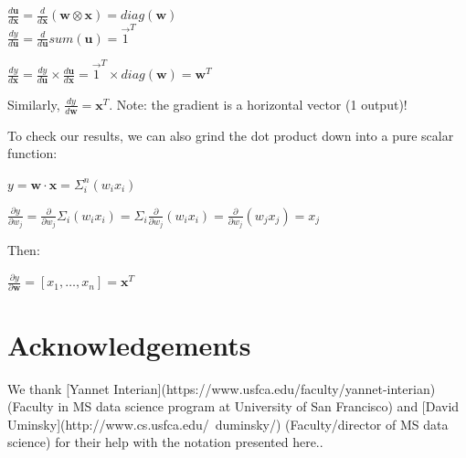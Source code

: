 \documentclass[11pt]{article}
\begin{document}
$\frac{d \mathbf{u}}{d\mathbf{x}} = \frac{d}{d\mathbf{x}} (\mathbf{w} \otimes \mathbf{x}) = diag(\mathbf{w})$\\
$\frac{dy}{d\mathbf{u}} = \frac{d}{d\mathbf{u}} sum(\mathbf{u}) = \vec{1}^T$

$\frac{dy}{d\mathbf{x}} = \frac{dy}{d\mathbf{u}} \times \frac{d\mathbf{u}}{d\mathbf{x}} = \vec{1}^T \times diag(\mathbf{w}) = \mathbf{w}^T$

Similarly, $\frac{dy}{d\mathbf{w}} = \mathbf{x}^T$. Note: the gradient is a horizontal vector (1 output)!

To check our results, we can also grind the dot product down into a pure scalar function:

$y = \mathbf{w} \cdot \mathbf{x} = \Sigma_i^n (w_i x_i)$

$\frac{\partial y}{\partial w_j} = \frac{\partial}{\partial w_j} \Sigma_i (w_i x_i) = \Sigma_i \frac{\partial}{\partial w_j} (w_i x_i) = \frac{\partial}{\partial w_j} (w_j x_j) = x_j$

Then:

$\frac{\partial y}{\partial \mathbf{w}} = [ x_1, \ldots, x_n ] = \mathbf{x}^T$

\section{Acknowledgements}

We thank [Yannet Interian](https://www.usfca.edu/faculty/yannet-interian) (Faculty in MS data science program at University of San Francisco) and [David Uminsky](http://www.cs.usfca.edu/~duminsky/) (Faculty/director of MS data science) for their help with the notation presented here..
\end{document}
